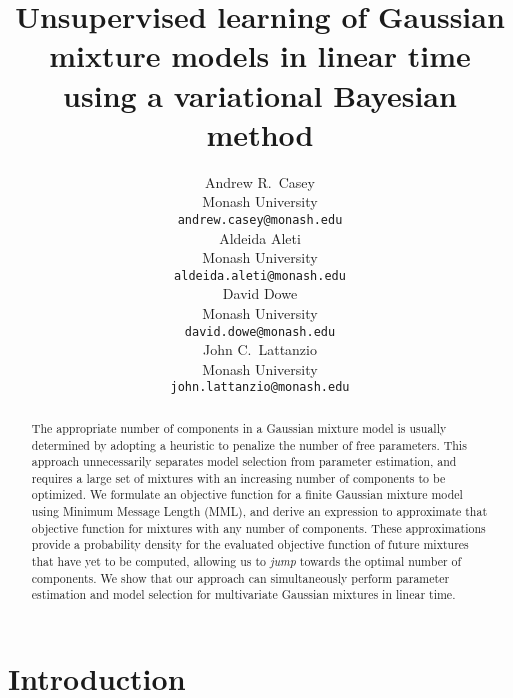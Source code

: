 \documentclass{article}
\title{
  Unsupervised learning of Gaussian mixture models in linear time
  using a variational Bayesian method
}
\author{
  Andrew R.~Casey\\
  Monash University\\
  \texttt{andrew.casey@monash.edu}\\
  \And 
  Aldeida Aleti\\
  Monash University\\
  \texttt{aldeida.aleti@monash.edu}\\
  \AND
  David Dowe\\
  Monash University\\
  \texttt{david.dowe@monash.edu}\\
  \And
  John C.~Lattanzio\\
  Monash University\\
  \texttt{john.lattanzio@monash.edu}\\
}
\begin{document}

\maketitle

\begin{abstract}
  The appropriate number of components in a Gaussian mixture model is usually 
  determined by adopting a heuristic to penalize the number of free parameters.
  This approach unnecessarily separates model selection from parameter estimation,
  and requires a large set of mixtures with an increasing number of components
  to be optimized.
  We formulate an objective function for a finite Gaussian mixture model using
  Minimum Message Length (MML), and derive an expression to approximate that
  objective function for mixtures with any number of components. 
  These approximations provide a probability density for the evaluated objective
  function of future mixtures that have yet to be computed, allowing us to 
  \emph{jump} towards the optimal number of components.
  We show that our approach can simultaneously perform parameter estimation and 
  model selection for multivariate Gaussian mixtures in linear time.
\end{abstract}


\section{Introduction}
\label{sec:introduction}






\end{document}
